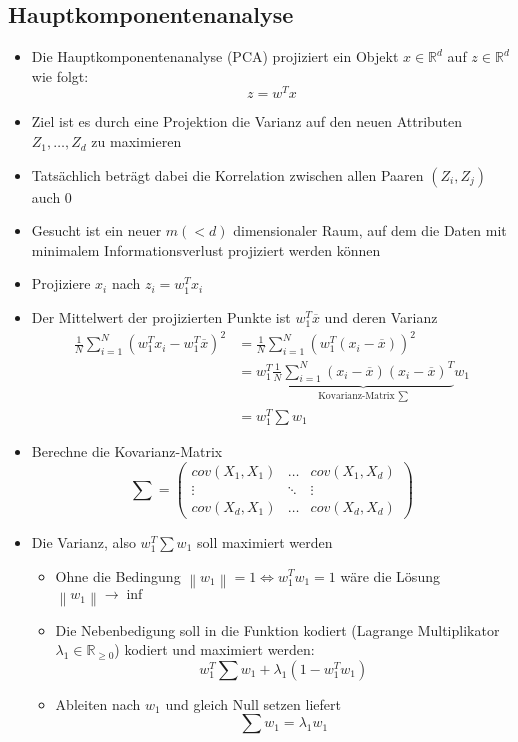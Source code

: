 \documentclass{scrartcl}
\newcommand{\norm}[1]{\left\lVert#1\right\rVert}
\begin{document}
\subsection{Hauptkomponentenanalyse}

\begin{itemize}
	\item Die Hauptkomponentenanalyse (PCA) projiziert ein Objekt $ x \in 
	\mathbb{R}^d $ auf $ z \in \mathbb{R}^d $ wie folgt:
	\[ z=w^Tx \]
	\item Ziel ist es durch eine Projektion die Varianz auf den neuen 
	Attributen $ Z_1,\ldots,Z_d $ zu maximieren
	\item Tatsächlich beträgt dabei die Korrelation zwischen allen Paaren $ 
	(Z_i,Z_j) $ auch 0
	\item Gesucht ist ein neuer $ m (<d) $ dimensionaler Raum, auf dem die 
	Daten mit minimalem Informationsverlust projiziert werden können
	\item Projiziere $ x_i $ nach $ z_i = w_1^T x_i $
	\item Der Mittelwert der projizierten Punkte ist $ w_1^T \overline{x} $ und 
	deren Varianz
	\begin{align*}
		\frac{1}{N} \sum_{i=1}^{N} (w_1^T x_i - w_1^T \overline{x})^2 &= 
		\frac{1}{N} \sum_{i=1}^{N} (w_1^T (x_i - \overline{x}))^2 \\
		&= w_1^T \underbrace{\frac{1}{N} \sum_{i=1}^{N} (x_i - 
		\overline{x})(x_i - \overline{x})^T}_{\text{Kovarianz-Matrix } \sum} 
		w_1 \\
		&= w_1^T \sum w_1
	\end{align*}
	\item Berechne die Kovarianz-Matrix
	\[ \sum = \begin{pmatrix}
		cov(X_1,X_1) & \ldots & cov(X_1,X_d) \\
		\vdots & \ddots & \vdots \\
		cov(X_d,X_1) & \ldots & cov(X_d,X_d)
	\end{pmatrix} \]
	\item Die Varianz, also $ w_1^T \sum w_1 $ soll maximiert werden
	\begin{itemize}
		\item Ohne die Bedingung $ \norm{w_1} = 1 \iff w_1^T w_1 = 1 $ wäre die 
		Lösung $ \norm{w_1} \rightarrow \inf $
		\item Die Nebenbedigung soll in die Funktion kodiert (Lagrange 
		Multiplikator $ \lambda_1 \in \mathbb{R}_{\geq 0} $) kodiert und 
		maximiert werden:
		\[ w_1^T \sum w_1 + \lambda_1 (1 - w_1^T w_1) \]
		\item Ableiten nach $ w_1 $ und gleich Null setzen liefert
		\[ \sum w_1 = \lambda_1 w_1 \]
	\end{itemize}
\end{itemize}
\end{document}
